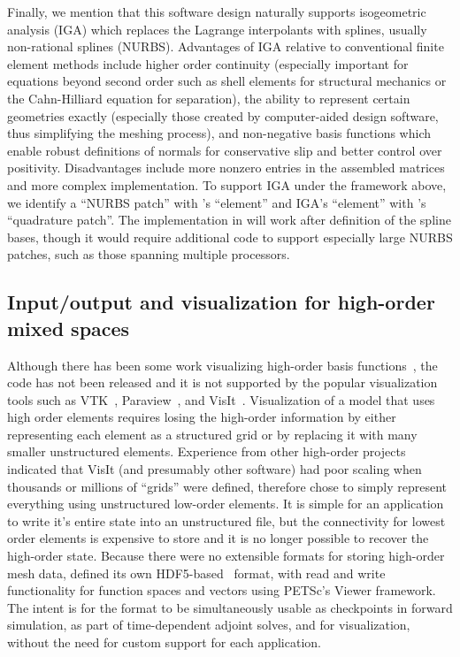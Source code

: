 Finally, we mention that this software design naturally supports isogeometric analysis (IGA) \cite{cottrell2009isogeometric} which replaces the Lagrange interpolants with splines, usually non-rational splines (NURBS).
Advantages of IGA relative to conventional finite element methods include higher order continuity (especially important for equations beyond second order such as shell elements for structural mechanics or the Cahn-Hilliard equation for separation), the ability to represent certain geometries exactly (especially those created by computer-aided design software, thus simplifying the meshing process), and non-negative basis functions which enable robust definitions of normals for conservative slip and better control over positivity.
Disadvantages include more nonzero entries in the assembled matrices and more complex implementation.
To support IGA under the framework above, we identify a ``NURBS patch'' with \Dohp's ``element'' and IGA's ``element'' with \Dohp's ``quadrature patch''.
The implementation in {\Dohp} will work after definition of the spline bases, though it would require additional code to support especially large NURBS patches, such as those spanning multiple processors.

\subsection{Input/output and visualization for high-order mixed spaces}
Although there has been some work visualizing high-order basis functions~\cite{schroeder2005framework,schroeder2006methods,ueffinger2010interactive}, the code has not been released and it is not supported by the popular visualization tools such as VTK~\cite{schroeder1998visualization}, Paraview~\cite{henderson2004paraview}, and VisIt~\cite{childs2006beyond}.
Visualization of a model that uses high order elements requires losing the high-order information by either representing each element as a structured grid or by replacing it with many smaller unstructured elements.
Experience from other high-order projects~\cite{fischer2008nek5000} indicated that VisIt (and presumably other software) had poor scaling when thousands or millions of ``grids'' were defined, therefore {\Dohp} chose to simply represent everything using unstructured low-order elements.
It is simple for an application to write it's entire state into an unstructured file, but the connectivity for lowest order elements is expensive to store and it is no longer possible to recover the high-order state.
Because there were no extensible formats for storing high-order mesh data, {\Dohp} defined its own HDF5-based~\cite{hdf5} format, with read and write functionality for function spaces and vectors using PETSc's Viewer framework.
The intent is for the format to be simultaneously usable as checkpoints in forward simulation, as part of time-dependent adjoint solves, and for visualization, without the need for custom support for each application.

